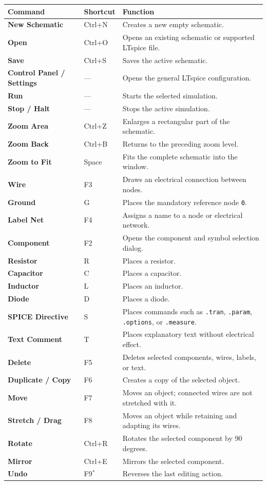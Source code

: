 \small
\begin{tabularx}{\textwidth}{>{\bfseries}p{34mm} >{\ttfamily}p{17mm} X}
\toprule
Command & Shortcut & Function \\
\midrule
New Schematic & Ctrl+N & Creates a new empty schematic. \\
Open & Ctrl+O & Opens an existing schematic or supported LTspice file. \\
Save & Ctrl+S & Saves the active schematic. \\
Control Panel / Settings & --- & Opens the general LTspice configuration. \\
Run & --- & Starts the selected simulation. \\
Stop / Halt & --- & Stops the active simulation. \\
Zoom Area & Ctrl+Z & Enlarges a rectangular part of the schematic. \\
Zoom Back & Ctrl+B & Returns to the preceding zoom level. \\
Zoom to Fit & Space & Fits the complete schematic into the window. \\
Wire & F3 & Draws an electrical connection between nodes. \\
Ground & G & Places the mandatory reference node \texttt{0}. \\
Label Net & F4 & Assigns a name to a node or electrical network. \\
Component & F2 & Opens the component and symbol selection dialog. \\
Resistor & R & Places a resistor. \\
Capacitor & C & Places a capacitor. \\
Inductor & L & Places an inductor. \\
Diode & D & Places a diode. \\
SPICE Directive & S & Places commands such as \texttt{.tran}, \texttt{.param},
  \texttt{.options}, or \texttt{.measure}. \\
Text Comment & T & Places explanatory text without electrical effect. \\
Delete & F5 & Deletes selected components, wires, labels, or text. \\
Duplicate / Copy & F6 & Creates a copy of the selected object. \\
Move & F7 & Moves an object; connected wires are not stretched with it. \\
Stretch / Drag & F8 & Moves an object while retaining and adapting its wires. \\
Rotate & Ctrl+R & Rotates the selected component by 90 degrees. \\
Mirror & Ctrl+E & Mirrors the selected component. \\
Undo & F9$^{*}$ & Reverses the last editing action. \\
\bottomrule
\end{tabularx}

